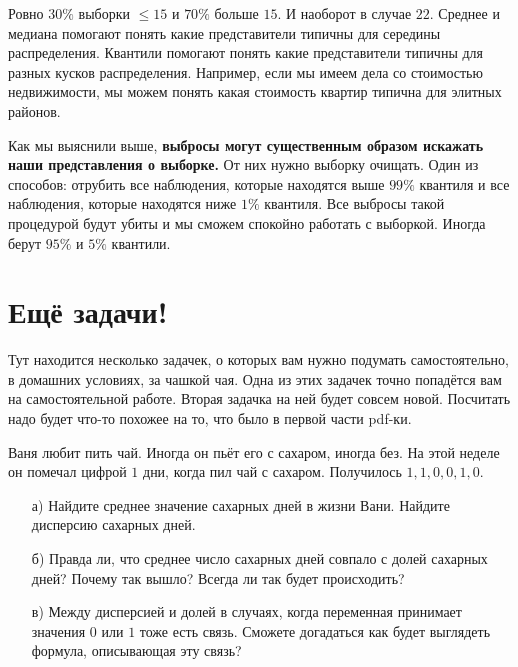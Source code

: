 \documentclass[12pt, a4paper, oneside]{article}
\theoremstyle{plain} %
\theoremstyle{definition}
\newcounter{problem}%
\renewcommand{\theproblem}{\arabic{problem}}
\newenvironment{problem}{
\addtocounter{problem}{1}\noindent{ \color{titleblue} \large \bfseries Упражнение~\theproblem \vspace{1ex} \newline}
}{ }
\newcommand{\indef}[1]{\textbf{ \color{green} #1}}
\begin{document}
\begin{solution}
\begin{enumerate}
	Ровно $30\%$ выборки $ \le 15$ и $70\%$ больше $15$. И наоборот в случае $22$. Среднее и медиана помогают понять какие представители типичны для середины распределения. Квантили помогают понять какие представители типичны для разных кусков распределения. Например, если мы имеем дела со стоимостью недвижимости, мы можем понять какая стоимость квартир типична для элитных районов. 

	Как мы выяснили выше, \indef{выбросы могут существенным образом искажать наши представления о выборке.} От них нужно выборку очищать. Один из способов: отрубить все наблюдения, которые находятся выше $99\%$ квантиля и все наблюдения, которые находятся ниже $1\%$ квантиля. Все выбросы такой процедурой будут убиты и мы сможем спокойно работать с выборкой. Иногда берут $95\%$ и $5\%$ квантили. 
\end{enumerate}
\end{solution}



\section*{Ещё задачи!} 

Тут находится несколько задачек, о которых вам нужно подумать самостоятельно, в домашних условиях, за чашкой чая. Одна из этих задачек точно попадётся вам на самостоятельной работе. Вторая задачка на ней будет совсем новой. Посчитать надо будет что-то похожее на то, что было в первой части pdf-ки.

\begin{problem} 
Ваня любит пить чай. Иногда он пьёт его с сахаром, иногда без. На этой неделе он помечал цифрой $1$ дни, когда пил чай с сахаром. Получилось $1,1,0,0,1,0$.  

\begin{enumerate}
    \item[а)] Найдите среднее значение сахарных дней в жизни Вани. Найдите дисперсию сахарных дней.
    \item[б)] Правда ли, что среднее число сахарных дней совпало с долей сахарных дней? Почему так вышло? Всегда ли так будет происходить?
    \item[в)] Между дисперсией и долей в случаях, когда переменная принимает значения $0$ или $1$ тоже есть связь. Сможете догадаться как будет выглядеть формула, описывающая эту связь? 
\end{enumerate}
\end{problem} 
\end{document}
